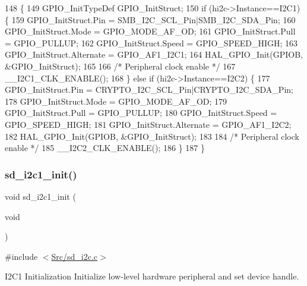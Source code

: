 \begin{DoxyCode}
148 \{
149     GPIO\_InitTypeDef GPIO\_InitStruct;
150     \textcolor{keywordflow}{if} (hi2c->Instance==I2C1) \{
159         GPIO\_InitStruct.Pin = SMB\_I2C\_SCL\_Pin|SMB\_I2C\_SDA\_Pin;
160         GPIO\_InitStruct.Mode = GPIO\_MODE\_AF\_OD;
161         GPIO\_InitStruct.Pull = GPIO\_PULLUP;
162         GPIO\_InitStruct.Speed = GPIO\_SPEED\_HIGH;
163         GPIO\_InitStruct.Alternate = GPIO\_AF1\_I2C1;
164         HAL\_GPIO\_Init(GPIOB, &GPIO\_InitStruct);
165 
166         \textcolor{comment}{/* Peripheral clock enable */}
167         \_\_I2C1\_CLK\_ENABLE();
168     \} \textcolor{keywordflow}{else} \textcolor{keywordflow}{if} (hi2c->Instance==I2C2) \{
177         GPIO\_InitStruct.Pin = CRYPTO\_I2C\_SCL\_Pin|CRYPTO\_I2C\_SDA\_Pin;
178         GPIO\_InitStruct.Mode = GPIO\_MODE\_AF\_OD;
179         GPIO\_InitStruct.Pull = GPIO\_PULLUP;
180         GPIO\_InitStruct.Speed = GPIO\_SPEED\_HIGH;
181         GPIO\_InitStruct.Alternate = GPIO\_AF1\_I2C2;
182         HAL\_GPIO\_Init(GPIOB, &GPIO\_InitStruct);
183 
184         \textcolor{comment}{/* Peripheral clock enable */}
185         \_\_I2C2\_CLK\_ENABLE();
186     \}
187 \}
\end{DoxyCode}
\mbox{\label{group___s_d___i2_c___functions_ga47b7e9401e2826acc6b03f258dc644a9}} 
\subsubsection{\texorpdfstring{sd\+\_\+i2c1\+\_\+init()}{sd\_i2c1\_init()}}
{\footnotesize\ttfamily void sd\+\_\+i2c1\+\_\+init (\begin{DoxyParamCaption}\item[{void}]{ }\end{DoxyParamCaption})}



{\ttfamily \#include $<$\mbox{\hyperlink{sd__i2c_8c}{Src/sd\+\_\+i2c.\+c}}$>$}



I2\+C1 Initialization Initialize low-\/level hardware peripheral and set device handle. 

